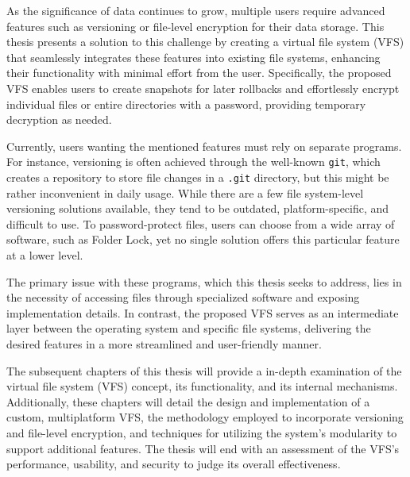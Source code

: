 

As the significance of data continues to grow, multiple users require advanced features such as versioning or file-level encryption for their data storage.
This thesis presents a solution to this challenge by creating a virtual file system (VFS) that seamlessly integrates these features into existing file systems, enhancing their functionality with minimal effort from the user.
Specifically, the proposed VFS enables users to create snapshots for later rollbacks and effortlessly encrypt individual files or entire directories with a password, providing temporary decryption as needed.

Currently, users wanting the mentioned features must rely on separate programs.
For instance, versioning is often achieved through the well-known \texttt{git}, which creates a repository to store file changes in a \texttt{.git} directory, but this might be rather inconvenient in daily usage.
While there are a few file system-level versioning solutions available, they tend to be outdated, platform-specific, and difficult to use.
To password-protect files, users can choose from a wide array of software, such as Folder Lock, yet no single solution offers this particular feature at a lower level.

The primary issue with these programs, which this thesis seeks to address, lies in the necessity of accessing files through specialized software and exposing implementation details.
In contrast, the proposed VFS serves as an intermediate layer between the operating system and specific file systems, delivering the desired features in a more streamlined and user-friendly manner.

The subsequent chapters of this thesis will provide a in-depth examination of the virtual file system (VFS) concept, its functionality, and its internal mechanisms.
Additionally, these chapters will detail the design and implementation of a custom, multiplatform VFS, the methodology employed to incorporate versioning and file-level encryption, and techniques for utilizing the system's modularity to support additional features.
The thesis will end with an assessment of the VFS's performance, usability, and security to judge its overall effectiveness.
